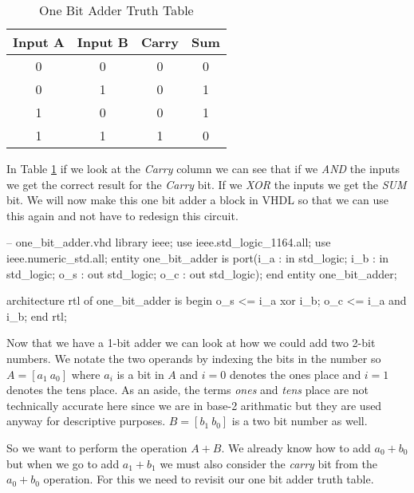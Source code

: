 \begin{table}[h!]  
\begin{center}    
\caption{One Bit Adder Truth Table} 
\label{tab:tt2ba} 
\begin{tabular}{|c|c|c|c|}  
\textbf{Input A} & \textbf{Input B} & \textbf{Carry} & \textbf{Sum}\\  
\hline  
0 & 0 & 0 & 0\\  
0 & 1 & 0 & 1\\  
1 & 0 & 0 & 1\\  
1 & 1 & 1 & 0\\ 
\end{tabular}  
\end{center}
\end{table}
	
In Table \ref{tab:tt2ba} if we look at the \emph{Carry} column we can see that if we \emph{AND} the inputs we get the correct result for the \emph{Carry} bit. If we \emph{XOR} the inputs we get the \emph{SUM} bit. We will now make this one bit adder a block in \ac{VHDL} so that we can use this again and not have to redesign this circuit.

\begin{VHDLlisting}[tabsize=8]
-- one_bit_adder.vhd
library ieee; 
	use ieee.std_logic_1164.all; 
	use ieee.numeric_std.all; 
entity one_bit_adder is
port(i_a : in    std_logic;  
     i_b : in    std_logic;  
	 o_s :   out std_logic;  
	 o_c :   out std_logic);
end entity one_bit_adder;

architecture rtl of one_bit_adder is
begin 
	o_s <= i_a xor i_b; 
	o_c <= i_a and i_b;
end rtl;
\end{VHDLlisting}

Now that we have a 1-bit adder we can look at how we could add two 2-bit numbers. We notate the two operands by indexing the bits in the number so $A=[a_1~a_0]$ where $a_i$ is a bit in $A$ and $i=0$ denotes the ones place and $i=1$ denotes the tens place. As an aside, the terms \emph{ones} and \emph{tens} place are not technically accurate here since we are in base-2 arithmatic but they are used anyway for descriptive purposes. $B=[b_1~b_0]$ is a two bit number as well.

So we want to perform the operation $A+B$. We already know how to add $a_0+b_0$ but when we go to add $a_1+b_1$ we must also consider the \emph{carry} bit from the $a_0+b_0$ operation. For this we need to revisit our one bit adder truth table.

